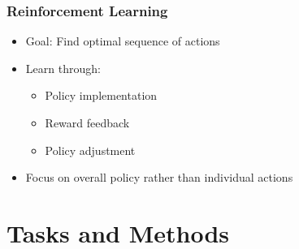 \subsection{Reinforcement Learning}
\begin{itemize}
    \item Goal: Find optimal sequence of actions
    \item Learn through:
    \begin{itemize}
        \item Policy implementation
        \item Reward feedback
        \item Policy adjustment
    \end{itemize}
    \item Focus on overall policy rather than individual actions
\end{itemize}

\chapter{Tasks and Methods}

